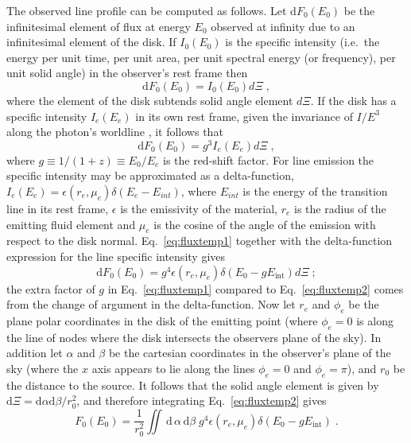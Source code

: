 The observed line profile can be computed as follows. Let $\textrm{d}F_{0}(E_{0})$ be the infinitesimal element of flux at energy $E_{0}$ observed at infinity due to an infinitesimal element of the disk. If $I_{0}(E_{0})$ is the specific intensity (i.e.\ the energy per unit time, per unit area, per unit spectral energy (or frequency), per unit solid angle) in the observer's rest frame then
\begin{equation} \textrm{d}F_{0}(E_{0})=I_{0}(E_{0})d\Xi \; ,\end{equation}
where the element of the disk subtends solid angle element $d\Xi$. If the disk has a specific intensity $I_{e}(E_{e})$ in its own rest frame, given the invariance of $I/E ^{3}$ along the photon's worldline \citep{MTW}, it follows that
\begin{equation}\label{eq:fluxtemp1} \textrm{d}F_{0}(E_{0})=g^{3}I_{e}(E_{e})d\Xi \; , \end{equation}
where $g\equiv1/(1+z)\equiv E_{0}/E_{e}$ is the red-shift factor. For line emission the specific intensity may be approximated as a delta-function, $I_{e}(E_{e})=\epsilon (r_{e},\mu_{e})\delta (E_{e}-E_{int})$, where $E_{int}$ is the energy of the transition line in its rest frame, $\epsilon$ is the emissivity of the material, $r_{e}$ is the radius of the emitting fluid element and $\mu_{e}$ is the cosine of the angle of the emission with respect to the disk normal. Eq.\ \ref{eq:fluxtemp1} together with the delta-function expression for the line specific intensity gives
\begin{equation}\label{eq:fluxtemp2} \textrm{d}F_{0}(E_{0})=g^{4}\epsilon(r_{e},\mu_{e})\delta(E_{0}-gE_{\textrm{int}})d\Xi \; ; \end{equation}
the extra factor of $g$ in Eq.\ \ref{eq:fluxtemp1} compared to Eq.\ \ref{eq:fluxtemp2} comes from the change of argument in the delta-function. Now let $r_{e}$ and $\phi_{e}$ be the plane polar coordinates in the disk of the emitting point (where $\phi_{e}=0$ is along the line of nodes where the disk intersects the observers plane of the sky). In addition let $\alpha$ and $\beta$ be the cartesian coordinates in the observer's plane of the sky (where the $x$ axis appears to lie along the lines $\phi_{e}=0$ and $\phi_{e}=\pi$), and $r_{0}$ be the distance to the source. It follows that the solid angle element is given by $\textrm{d}\Xi = \textrm{d}\alpha \textrm{d}\beta / r_{0}^{2}$, and therefore integrating Eq.\ \ref{eq:fluxtemp2} gives
\begin{equation}\label{eq:fluxtemp3} F_{0}(E_{0})=\frac{1}{r_{0}^{2}} \iint\,\textrm{d}\,\alpha\, \textrm{d}\beta\; g^{4}\epsilon(r_{e},\mu_{e})\delta(E_{0}-gE_{\textrm{int}}) \; . \end{equation}
